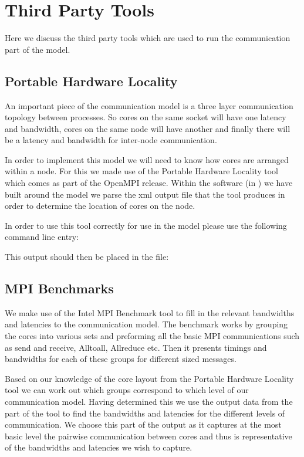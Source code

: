 
\chapter{Third Party Tools} %

\label{Chapter4} %

Here we discuss the third party tools which are used to run the communication part of the model.

\section{Portable Hardware Locality}
An important piece of the communication model is a three layer communication topology between processes. So cores on the same socket will have one latency and bandwidth, cores on the same node will have another and finally there will be a latency and bandwidth for inter-node communication. 

In order to implement this model we will need to know how cores are arranged within a node. For this we made use of the Portable Hardware Locality tool which comes as part of the OpenMPI release. Within the software (in ) we have built around the model we parse the xml output file that the tool produces in order to determine the location of cores on the node.

In order to use this tool correctly for use in the model please use the following command line entry:


This output should then be placed in the file:


\section{MPI Benchmarks}
We make use of the Intel MPI Benchmark tool \cite{INTEL} to fill in the relevant bandwidths and latencies to the communication model. The benchmark works by grouping the cores into various sets and preforming all the basic MPI communications such as send and receive, Alltoall, Allreduce etc. Then it presents timings and bandwidths for each of these groups for different sized messages. 

Based on our knowledge of the core layout from the Portable Hardware Locality tool we can work out which groups correspond to which level of our communication model. Having determined this we use the output data from the  part of the tool to find the bandwidths and latencies for the different levels of communication. We choose this part of the output as it captures at the most basic level the pairwise communication between cores and thus is representative of the bandwidths and latencies we wish to capture.

